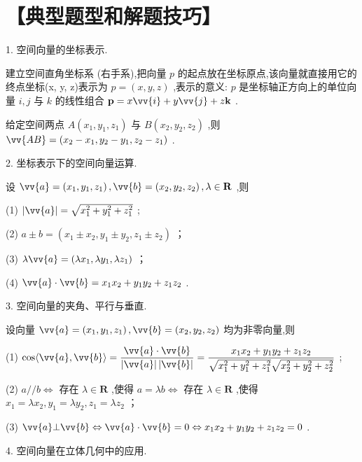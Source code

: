 \section*{【典型题型和解题技巧】}

1. 空间向量的坐标表示.

建立空间直角坐标系 (右手系),把向量 $p$ 的起点放在坐标原点,该向量就直接用它的终点坐标(x, y, z)表示为 $p = \left( {x,y,z}\right)$ ,表示的意义: $p$ 是坐标轴正方向上的单位向量 $i,j$ 与 $k$ 的线性组合 $\mathbf{p} = x\vv{i} + y\vv{j} + z\mathbf{k}$ .

给定空间两点 $A\left( {{x}_{1},{y}_{1},{z}_{1}}\right)$ 与 $B\left( {{x}_{2},{y}_{2},{z}_{2}}\right)$ ,则 $\vv{AB} = \left( {{x}_{2} - {x}_{1},{y}_{2} - {y}_{1},{z}_{2} - {z}_{1}}\right)$ .

2. 坐标表示下的空间向量运算.

设 $\vv{a} = \left( {{x}_{1},{y}_{1},{z}_{1}}\right) ,\vv{b} = \left( {{x}_{2},{y}_{2},{z}_{2}}\right) ,\lambda  \in  \mathbf{R}$ ,则

(1) $\left| \vv{a}\right|  = \sqrt{{x}_{1}^{2} + {y}_{1}^{2} + {z}_{1}^{2}}$ ;

(2) $a \pm  b = \left( {{x}_{1} \pm  {x}_{2},{y}_{1} \pm  {y}_{2},{z}_{1} \pm  {z}_{2}}\right)$ ；

(3) $\lambda \vv{a} = \left( {\lambda {x}_{1},\lambda {y}_{1},\lambda {z}_{1}}\right)$ ；

(4) $\vv{a} \cdot  \vv{b} = {x}_{1}{x}_{2} + {y}_{1}{y}_{2} + {z}_{1}{z}_{2}$ .

3. 空间向量的夹角、平行与垂直.

设向量 $\vv{a} = \left( {{x}_{1},{y}_{1},{z}_{1}}\right) ,\vv{b} = \left( {{x}_{2},{y}_{2},{z}_{2}}\right)$ 均为非零向量,则

(1) $\cos \langle \vv{a},\vv{b}\rangle  = \dfrac{\vv{a} \cdot  \vv{b}}{\left| \vv{a}\right| \left| \vv{b}\right| } = \dfrac{{x}_{1}{x}_{2} + {y}_{1}{y}_{2} + {z}_{1}{z}_{2}}{\sqrt{{x}_{1}^{2} + {y}_{1}^{2} + {z}_{1}^{2}}\sqrt{{x}_{2}^{2} + {y}_{2}^{2} + {z}_{2}^{2}}}$ ;

(2) $a//b \Leftrightarrow$ 存在 $\lambda  \in  \mathbf{R}$ ,使得 $a = {\lambda b} \Leftrightarrow$ 存在 $\lambda  \in  \mathbf{R}$ ,使得 ${x}_{1} = \lambda {x}_{2},{y}_{1} = \lambda {y}_{2},{z}_{1} = \lambda {z}_{2}$ ；

(3) $\vv{a}\bot \vv{b} \Leftrightarrow  \vv{a} \cdot  \vv{b} = 0 \Leftrightarrow  {x}_{1}{x}_{2} + {y}_{1}{y}_{2} + {z}_{1}{z}_{2} = 0$ .

4. 空间向量在立体几何中的应用.

